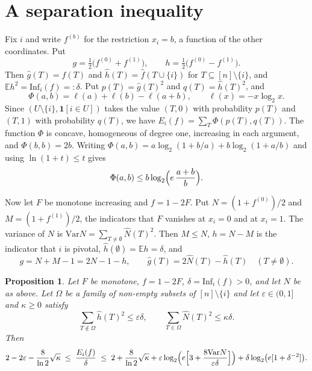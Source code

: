 \documentclass[11pt]{amsart}
\newtheorem{proposition}[theorem]{Proposition}
\theoremstyle{remark}
\newcommand{\Inf}{\mathrm{Inf}}
\newcommand{\Var}{\mathrm{Var}}
\newcommand{\E}{\mathbb{E}}
\begin{document}
\section{A separation inequality}\label{sec:sep}

Fix $i$ and write $f^{(b)}$ for the restriction $x_i=b$, a function of the other coordinates. Put
\[
g=\tfrac12\bigl(f^{(0)}+f^{(1)}\bigr),\qquad h=\tfrac12\bigl(f^{(0)}-f^{(1)}\bigr).
\]
Then $\hat g(T)=\hat f(T)$ and $\hat h(T)=\hat f(T\cup\{i\})$ for $T\subseteq[n]\setminus\{i\}$, and $\E
h^2=\Inf_i(f)=:\delta$. Put $p(T)=\hat g(T)^2$ and $q(T)=\hat h(T)^2$, and
\[
\Phi(a,b)=\ell(a)+\ell(b)-\ell(a+b),\qquad \ell(x)=-x\log_2x.
\]
Since $(U\setminus\{i\},\mathbf 1[i\in U])$ takes the value $(T,0)$ with probability $p(T)$ and $(T,1)$ with probability
$q(T)$, we have $E_i(f)=\sum_T\Phi(p(T),q(T))$. The function $\Phi$ is concave, homogeneous of degree one, increasing in
each argument, and $\Phi(b,b)=2b$. Writing $\Phi(a,b)=a\log_2(1+b/a)+b\log_2(1+a/b)$ and using $\ln(1+t)\le t$ gives
\begin{equation}\label{eq:phiq}
\Phi(a,b)\le b\log_2\Bigl(e\,\frac{a+b}{b}\Bigr).
\end{equation}

Now let $F$ be monotone increasing and $f=1-2F$. Put $N=(1+f^{(0)})/2$ and $M=(1+f^{(1)})/2$, the indicators that $F$
vanishes at $x_i=0$ and at $x_i=1$. The variance of $N$ is $\Var N=\sum_{T\ne\emptyset}\hat N(T)^2$. Then $M\le N$, $h=N-M$ is the indicator that $i$ is pivotal, $\hat
h(\emptyset)=\E h=\delta$, and
\[
g=N+M-1=2N-1-h,\qquad \hat g(T)=2\hat N(T)-\hat h(T)\quad(T\neq\emptyset).
\]

\begin{proposition}\label{prop:sep}
Let $F$ be monotone, $f=1-2F$, $\delta=\Inf_i(f)>0$, and let $N$ be as above. Let $\Omega$ be a family of non-empty
subsets of $[n]\setminus\{i\}$ and let $\varepsilon\in(0,1]$ and $\kappa\ge0$ satisfy
\[
\sum_{T\notin\Omega}\hat h(T)^2\le\varepsilon\delta,\qquad \sum_{T\in\Omega}\hat N(T)^2\le\kappa\delta.
\]
Then
\[
2-2\varepsilon-\frac{8}{\ln2}\sqrt\kappa\;\le\;\frac{E_i(f)}{\delta}\;\le\;2+\frac{8}{\ln2}\sqrt\kappa
+\varepsilon\log_2\Bigl(e\Bigl[3+\frac{8\Var N}{\varepsilon\delta}\Bigr]\Bigr)+\delta\log_2\bigl(e[1+\delta^{-2}]\bigr).
\]
\end{proposition}
\end{document}
